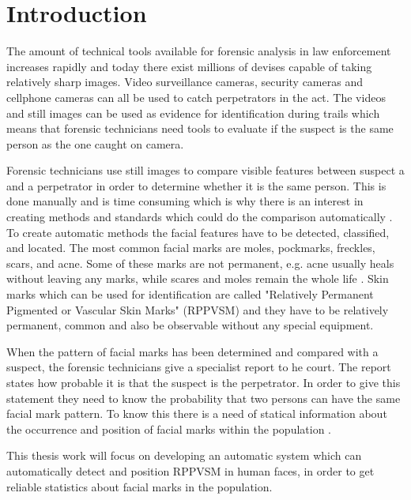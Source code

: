 \documentclass{article}
\begin{document}
\setcounter{page}{1}


\section{Introduction}

The amount of technical tools available for forensic analysis in law enforcement increases rapidly and today there exist millions of devises capable of taking relatively sharp images. Video surveillance cameras, security cameras and cellphone cameras can all be used to catch perpetrators in the act. The videos and still images can be used as evidence for identification during trails which means that forensic technicians need tools to evaluate if the suspect is the same person as the one caught on camera.

Forensic technicians use still images to compare visible features between suspect a and a perpetrator in order to determine whether it is the same person. This is done manually and is time consuming which is why there is an interest in creating methods and standards which could do the comparison automatically \cite{forensic_identification}. To create automatic methods the facial features have to be detected, classified, and located. The most common facial marks are moles, pockmarks, freckles, scars, and acne. Some of these marks are not permanent, e.g. acne usually heals without leaving any marks, while scares and moles remain the whole life    \cite{automatic_detector_2015}. Skin marks which can be used for identification are called "Relatively Permanent Pigmented or Vascular Skin Marks" (RPPVSM) and they have to be relatively permanent, common and also be observable without any special equipment. \cite{statistic_RPPVSM}

When the pattern of facial marks has been determined and compared with a suspect, the forensic technicians give a specialist report to he court. The report states how probable it is that the suspect is the perpetrator. In order to give this statement they need to know the probability that two persons can have the same facial mark pattern. To know this there is a need of statical information about the occurrence and position of facial marks within the population \cite{NFC_stat}.

This thesis work will focus on developing an automatic system which can automatically detect and position RPPVSM in human faces, in order to get reliable statistics about facial marks in the population.   
\end{document}
